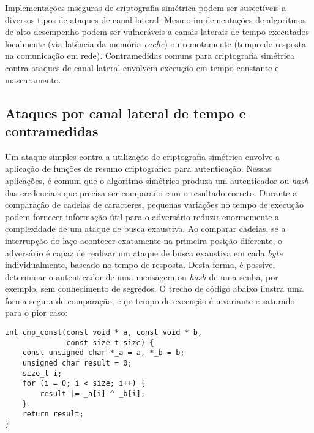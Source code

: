 Implementações inseguras de criptografia simétrica podem ser suscetíveis a diversos tipos de ataques
de canal lateral. Mesmo implementações de algoritmos de alto desempenho podem ser vulneráveis a canais
laterais de tempo executados localmente (via latência da memória \emph{cache}) ou remotamente
(tempo de resposta na comunicação em rede). Contramedidas comuns para criptografia simétrica contra ataques de canal lateral
envolvem execução em tempo constante e mascaramento.

\subsection{Ataques por canal lateral de tempo e contramedidas}

Um ataque simples contra a utilização de criptografia simétrica envolve a aplicação de funções de resumo criptográfico
para autenticação. Nessas aplicações, é comum que o algoritmo simétrico produza um autenticador ou \emph{hash} das credenciais
que precisa ser comparado com o resultado correto. Durante a comparação de cadeias de caracteres,
pequenas variações no tempo de execução podem fornecer informação útil para o adversário reduzir enormemente a complexidade de um
ataque de busca exaustiva. Ao comparar cadeias, se a interrupção do laço acontecer exatamente na primeira posição diferente,
o adversário é capaz de realizar um ataque de busca exaustiva em cada \emph{byte} individualmente,
baseado no tempo de resposta. Desta forma, é possível determinar o autenticador de uma mensagem ou \emph{hash} de uma senha, por exemplo,
sem conhecimento de segredos. O trecho de código abaixo ilustra uma forma segura de comparação, cujo tempo de execução é invariante e saturado para o pior caso:
\begin{center}
\begin{verbatim}
int cmp_const(const void * a, const void * b,
              const size_t size) {
    const unsigned char *_a = a, *_b = b;
    unsigned char result = 0;
    size_t i;
    for (i = 0; i < size; i++) {
        result |= _a[i] ^ _b[i];
    }
    return result;
}
\end{verbatim}
\end{center}

